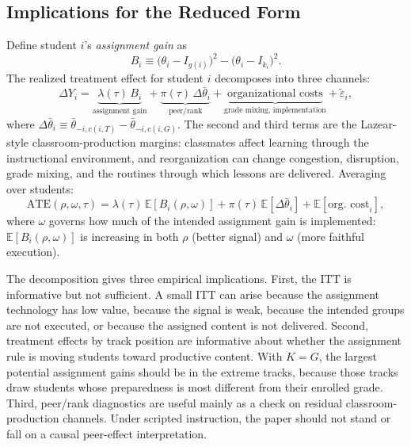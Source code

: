 \documentclass[11pt]{article}
\newcommand{\E}{\mathbb{E}}
\begin{document}
\subsection{Implications for the Reduced Form}

Define student $i$'s \emph{assignment gain} as
\begin{equation}
\label{eq:Bi}
B_i \equiv \big(\theta_i - I_{g(i)}\big)^2 - \big(\theta_i - I_{k_i}\big)^2.
\end{equation}
The realized treatment effect for student $i$ decomposes into three channels:
\begin{equation}
\label{eq:decomp_full}
\Delta Y_i = \underbrace{\lambda(\tau)\, B_i}_{\text{assignment gain}} + \underbrace{\pi(\tau)\,\Delta\bar{\theta}_i}_{\text{peer/rank}} + \underbrace{\text{organizational costs}}_{\text{grade mixing, implementation}} + \tilde{\varepsilon}_i,
\end{equation}
where $\Delta\bar{\theta}_i \equiv \bar{\theta}_{-i,c(i,T)} - \bar{\theta}_{-i,c(i,G)}$. The second and third terms are the Lazear-style classroom-production margins: classmates affect learning through the instructional environment, and reorganization can change congestion, disruption, grade mixing, and the routines through which lessons are delivered. Averaging over students:
\begin{equation}
\label{eq:ate}
\text{ATE}(\rho, \omega, \tau) = \lambda(\tau)\,\E[B_i(\rho, \omega)] + \pi(\tau)\,\E[\Delta\bar{\theta}_i] + \E[\text{org.\ cost}_i],
\end{equation}
where $\omega$ governs how much of the intended assignment gain is implemented: $\E[B_i(\rho, \omega)]$ is increasing in both $\rho$ (better signal) and $\omega$ (more faithful execution).

The decomposition gives three empirical implications. First, the ITT is informative but not sufficient. A small ITT can arise because the assignment technology has low value, because the signal is weak, because the intended groups are not executed, or because the assigned content is not delivered. Second, treatment effects by track position are informative about whether the assignment rule is moving students toward productive content. With $K=G$, the largest potential assignment gains should be in the extreme tracks, because those tracks draw students whose preparedness is most different from their enrolled grade. Third, peer/rank diagnostics are useful mainly as a check on residual classroom-production channels. Under scripted instruction, the paper should not stand or fall on a causal peer-effect interpretation.
\end{document}
